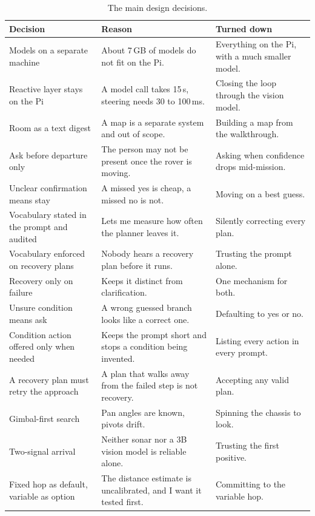 \begin{table}[htbp]
  \centering
  \caption{The main design decisions.}
  \label{tab:decisions}
  \small
  \begin{tabular}{@{}p{3.6cm} p{5.6cm} p{4.0cm}@{}}
    \toprule
    Decision & Reason & Turned down \\
    \midrule
    Models on a separate machine & About 7\,GB of models do not fit on the Pi. & Everything on the Pi, with a much smaller model. \\
    Reactive layer stays on the Pi & A model call takes 15\,s, steering needs 30 to 100\,ms. & Closing the loop through the vision model. \\
    Room as a text digest & A map is a separate system and out of scope. & Building a map from the walkthrough. \\
    Ask before departure only & The person may not be present once the rover is moving. & Asking when confidence drops mid-mission. \\
    Unclear confirmation means stay & A missed yes is cheap, a missed no is not. & Moving on a best guess. \\
    Vocabulary stated in the prompt and audited & Lets me measure how often the planner leaves it. & Silently correcting every plan. \\
    Vocabulary enforced on recovery plans & Nobody hears a recovery plan before it runs. & Trusting the prompt alone. \\
    Recovery only on failure & Keeps it distinct from clarification. & One mechanism for both. \\
    Unsure condition means ask & A wrong guessed branch looks like a correct one. & Defaulting to yes or no. \\
    Condition action offered only when needed & Keeps the prompt short and stops a condition being invented. & Listing every action in every prompt. \\
    A recovery plan must retry the approach & A plan that walks away from the failed step is not recovery. & Accepting any valid plan. \\
    Gimbal-first search & Pan angles are known, pivots drift. & Spinning the chassis to look. \\
    Two-signal arrival & Neither sonar nor a 3B vision model is reliable alone. & Trusting the first positive. \\
    Fixed hop as default, variable as option & The distance estimate is uncalibrated, and I want it tested first. & Committing to the variable hop. \\
    \bottomrule
  \end{tabular}
\end{table}
